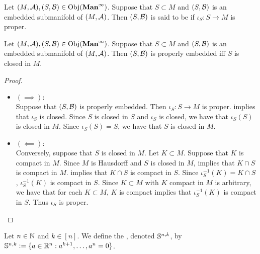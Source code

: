 \documentclass{book}
\begin{document}
	\begin{defn} 
		Let $(M, \MA), (S, \MB) \in \Obj(\Maninf)$. Suppose that $S \subset M$ and $(S, \MB)$ is an embedded submanifold of $(M, \MA)$. Then $(S, \MB)$ is said to be  if $\iota_S:S \rightarrow M$ is proper.
	\end{defn}

	\begin{ex} 
		Let $(M, \MA), (S, \MB) \in \Obj(\Maninf)$. Suppose that $S \subset M$ and $(S, \MB)$ is an embedded submanifold of $(M, \MA)$. Then $(S, \MB)$ is properly embedded iff $S$ is closed in $M$. 
	\end{ex}

	\begin{proof}\
		\begin{itemize}
			\item $(\implies):$ \\
			Suppose that $(S, \MB)$ is properly embedded. Then $\iota_S:S \rightarrow M$ is proper.  implies that $\iota_S$ is closed. Since $S$ is closed in $S$ and $\iota_S$ is closed, we have that $\iota_S(S)$ is closed in $M$. Since $\iota_S(S) = S$, we have that $S$ is closed in $M$. 
			\item $(\impliedby):$ \\
			Conversely, suppose that $S$ is closed in $M$. Let $K \subset M$. Suppose that $K$ is compact in $M$. Since $M$ is Hausdorff and $S$ is closed in $M$,  implies that $K \cap S$ is compact in $M$.  implies that $K \cap S$ is compact in $S$. Since $\iota_S^{-1}(K) = K \cap S$, $\iota_S^{-1}(K)$ is compact in $S$. Since $K \subset M$ with $K$ compact in $M$ is arbitrary, we have that for each $K \subset M$, $K$ is compact implies that $\iota_S^{-1}(K)$ is compact in $S$. Thus $\iota_S$ is proper. 
		\end{itemize}
	\end{proof}

	\begin{defn}  
		Let $n \in \N$ and $k \in [n]$. We define the , denoted $\S^{n,k}$, by $\S^{n,k} \defeq \{a \in \R^n : a^{k+1}, \ldots, a^n = 0\}$.
	\end{defn}
	
\end{document}

